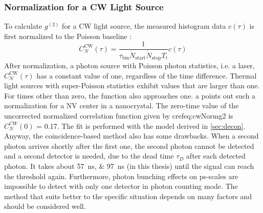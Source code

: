 \subsubsection{Normalization for a CW Light Source}
To calculate $g^{(2)}$ for a \ac{CW} light source, the measured histogram data $c(\tau)$ is first normalized to the Poisson baseline \cite{beveratos_room_2002,swabian_instruments_time_2021}:
\begin{equation}\label{eq:cwNormg2}
	C^\mathrm{CW}_N(\tau)=\dfrac{1}{\tau_\mathrm{bin}\dot{N}_\mathrm{start}\dot{N}_\mathrm{stop}T_t}c(\tau)
\end{equation}
After normalization, a photon source with Poisson photon statistics, i.e. a laser, $C^\mathrm{CW}_N(\tau)$ has a constant value of one, regardless of the time difference. Thermal light sources with super-Poisson statistics exhibit values that are larger than one. For times other than zero, the function also approaches one. a points out such a normalization for a \ac{NV} center in a nanocrystal. The zero-time value of the uncorrected normalized correlation function given by cref{eq:cwNormg2} is $C^{CW}_N(0)$ = \num{0.17}. The fit is performed with the model derived in \cref{sec:decon}.\newline
Anyway, the coincidence-based method also has some drawbacks. When a second photon arrives shortly after the first one, the second photon cannot be detected and a second detector is needed, due to the dead time $\tau_D$ after each detected photon. It takes about \SIlist{57;97}{\ns} (in this thesis) until the signal can reach the threshold again. Furthermore, photon bunching effects on \si{ps}-scales are impossible to detect with only one detector in photon counting mode. The method that suits better to the specific situation depends on many factors and should be considered well.

